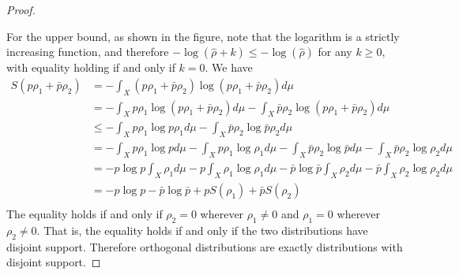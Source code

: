 \begin{mathSection}
\begin{proof}
		\begin{figure}[H]
			\centering
		\end{figure}
		For the upper bound, as shown in the figure, note that the logarithm is a strictly increasing function, and therefore $- \log(\hat{\rho} + k) \leq -\log(\hat{\rho})$ for any $k \geq 0$, with equality holding if and only if $k=0$. We have
		\begin{equation}
			\begin{aligned}
				S(p\rho_1 + \bar{p}\rho_2) &= - \int_X \left(p\rho_1 + \bar{p}\rho_2\right) \log \left(p\rho_1 + \bar{p}\rho_2\right) d\mu \\
				&= - \int_X p\rho_1 \log \left(p\rho_1 + \bar{p}\rho_2\right) d\mu - \int_X \bar{p}\rho_2 \log \left(p\rho_1 + \bar{p}\rho_2\right) d\mu \\
				&\leq  - \int_X p\rho_1 \log p\rho_1 d\mu - \int_X \bar{p}\rho_2 \log \bar{p}\rho_2 d\mu\\
				&=  - \int_X p\rho_1 \log p d\mu - \int_X p\rho_1 \log \rho_1 d\mu - \int_X \bar{p}\rho_2 \log \bar{p} d\mu - \int_X \bar{p}\rho_2 \log \rho_2 d\mu\\
				&=  - p \log p \int_X \rho_1 d\mu - p \int_X \rho_1 \log \rho_1 d\mu - \bar{p} \log \bar{p} \int_X \rho_2 d\mu - \bar{p} \int_X \rho_2 \log \rho_2 d\mu\\
				&=  - p \log p - \bar{p} \log \bar{p} + p S(\rho_1) + \bar{p} S(\rho_2)\\
			\end{aligned}
		\end{equation}
		The equality holds if and only if $\rho_2=0$ wherever $\rho_1\neq0$ and $\rho_1=0$ wherever $\rho_2\neq0$. That is, the equality holds if and only if the two distributions have disjoint support. Therefore orthogonal distributions are exactly distributions with disjoint support.
		

\end{proof}
\end{mathSection}
